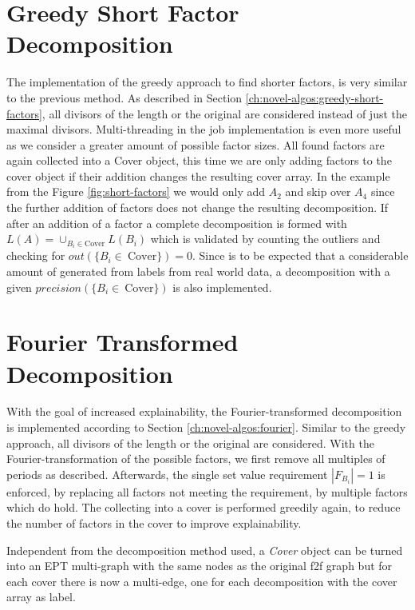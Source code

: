 \section{Greedy Short Factor Decomposition}
\label{ch:Implementation:greedy-short-factor}
The implementation of the greedy approach to find shorter factors, is very similar to the previous method. As described in Section \ref{ch:novel-algos:greedy-short-factors}, all divisors of the length or the original \DFA are considered instead of just the maximal divisors. Multi-threading in the job implementation is even more useful as we consider a greater amount of possible factor sizes. All found factors are again collected into a Cover object, this time we are only adding factors to the cover object if their addition changes the resulting cover array. In the example from the Figure \ref{fig:short-factors} we would only add $A_2$ and skip over $A_4$ since the further addition of factors does not change the resulting decomposition. If after an addition of a factor a complete decomposition is formed with $L(A) = \cup_{B_i \in \text{Cover}} L(B_i)$ which is validated by counting the outliers and checking for $out(\{B_i \in~\text{Cover}\}) = 0$. Since is to be expected that a considerable amount of \DFAs generated from labels from real world data, a decomposition with a given $precision(\{B_i \in~\text{Cover}\})$ is also implemented.

\section{Fourier Transformed Decomposition}
\label{ch:Implementation:fourier-transform}
With the goal of increased explainability, the Fourier-transformed decomposition is implemented according to Section \ref{ch:novel-algos:fourier}. Similar to the greedy approach, all divisors of the length or the original \DFA are considered. With the Fourier-transformation of the possible factors, we first remove all multiples of periods as described. Afterwards, the single set value requirement $|F_{B_i}| = 1$ is enforced, by replacing all factors not meeting the requirement, by multiple factors which do hold. The collecting into a cover is performed greedily again, to reduce the number of factors in the cover to improve explainability.

Independent from the decomposition method used, a \textit{Cover} object can be turned into an EPT multi-graph with the same nodes as the original f2f graph but for each cover there is now a multi-edge, one for each decomposition with the cover array as label.

